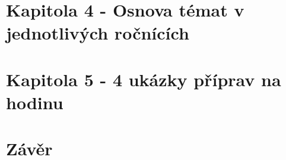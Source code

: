 \documentclass[a4paper, 12pt]{article}
\begin{document}
\section{Kapitola 4 - Osnova témat v jednotlivých ročnících}

\section{Kapitola 5 - 4 ukázky příprav na hodinu}

\section{Závěr}
\end{document}
